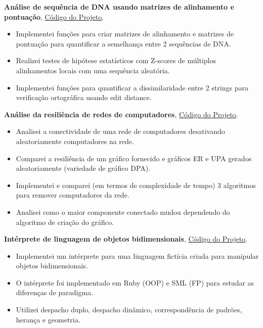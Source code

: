 \documentclass[a4paper,10pt]{article}
\newcommand{\ulink}[2]{\href{#1}{\underline{#2}}}
\begin{document}
\textbf{Análise de sequência de DNA usando matrizes de alinhamento e pontuação}, \ulink{https://github.com/rokobo/DNA-Sequence-Analysis}{Código do Projeto}.
\begin{itemize}[itemsep=0pt]
  \item Implementei funções para criar matrizes de alinhamento e matrizes de pontuação para quantificar a semelhança entre 2 sequências de DNA.
  \item Realizei testes de hipótese estatísticos com Z-scores de múltiplos alinhamentos locais com uma sequência aleatória.
  \item Implementei funções para quantificar a dissimilaridade entre 2 strings para verificação ortográfica usando edit distance.
\end{itemize}
\textbf{Análise da resiliência de redes de computadores}, \ulink{https://github.com/rokobo/Computer-Network-Resilience-Analysis}{Código do Projeto}.
\begin{itemize}[itemsep=0pt]
  \item Analisei a conectividade de uma rede de computadores desativando aleatoriamente computadores na rede.
  \item Comparei a resiliência de um gráfico fornecido e gráficos ER e UPA gerados aleatoriamente (variedade de gráfico DPA).
  \item Implementei e comparei (em termos de complexidade de tempo) 3 algoritmos para remover computadores da rede.
  \item Analisei como o maior componente conectado mudou dependendo do algoritmo de criação do gráfico.
\end{itemize}
\textbf{Intérprete de linguagem de objetos bidimensionais}, \ulink{https://github.com/rokobo/2D-objects-language}{Código do Projeto}.
\begin{itemize}[itemsep=0pt]
  \item Implementei um intérprete para uma linguagem fictícia criada para manipular objetos bidimensionais.
  \item O intérprete foi implementado em Ruby (OOP) e SML (FP) para estudar as diferenças de paradigma.
  \item Utilizei despacho duplo, despacho dinâmico, correspondência de padrões, herança e geometria.
\end{itemize}
\end{document}
